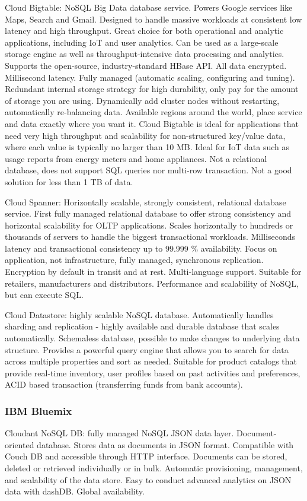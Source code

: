 Cloud Bigtable: NoSQL Big Data database service. Powers Google services like Maps, Search and Gmail. Designed to handle massive workloads at consistent low latency and high throughput. Great choice for both operational and analytic applications, including IoT and user analytics. Can be used as a large-scale storage engine as well as throughput-intensive data processing and analytics. Supports the open-source, industry-standard HBase API. All data encrypted. Millisecond latency. Fully managed (automatic scaling, configuring and tuning). Redundant internal storage strategy for high durability, only pay for the amount of storage you are using. Dynamically add cluster nodes without restarting, automatically re-balancing data. Available regions around the world, place service and data exactly where you want it. Cloud Bigtable is ideal for applications that need very high throughput and scalability for non-structured key/value data, where each value is typically no larger than 10 MB. Ideal for IoT data such as usage reports from energy meters and home appliances. Not a relational database, does not support SQL queries nor multi-row transaction. Not a good solution for less than 1 TB of data. 

Cloud Spanner: Horizontally scalable, strongly consistent, relational database service. First fully managed relational database to offer strong consistency and horizontal scalability for OLTP applications. Scales horizontally to hundreds or thousands of servers to handle the biggest transactional workloads. Milliseconds latency and transactional consistency up to 99.999 \% availability. Focus on application, not infrastructure, fully managed, synchronous replication. Encryption by default in transit and at rest. Multi-language support. Suitable for retailers, manufacturers and distributors. Performance and scalability of NoSQL, but can execute SQL. 

Cloud Datastore: highly scalable NoSQL database. Automatically handles sharding and replication - highly available and durable database that scales automatically. Schemaless database, possible to make changes to underlying data structure. Provides a powerful query engine that allows you to search for data across multiple properties and sort as needed. Suitable for product catalogs that provide real-time inventory, user profiles based on past activities and preferences, ACID based transaction (transferring funds from bank accounts).

\subsubsection{IBM Bluemix}
Cloudant NoSQL DB: fully managed NoSQL JSON data layer. Document-oriented database. Stores data as documents in JSON format. Compatible with Couch DB and accessible through HTTP interface. Documents can be stored, deleted or retrieved individually or in bulk. Automatic provisioning, management, and scalability of the data store. Easy to conduct advanced analytics on JSON data with dashDB. Global availability. 

